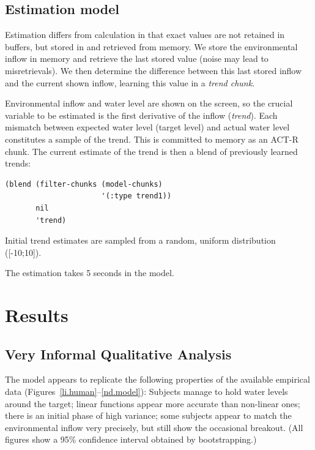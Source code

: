 \documentclass[twocolumn]{article}
\begin{document}
\subsection{Estimation model}
\label{sec:estimation-model}

Estimation differs from calculation in that exact values are not retained in buffers, but stored in and retrieved from memory.  We store the environmental inflow in memory and retrieve the last stored value (noise may lead to misretrievals).  We then determine the difference between this last stored inflow and the current shown inflow, learning this value in a \emph{trend chunk}.

Environmental inflow and water level are shown on the screen, so the crucial variable to be estimated is the first derivative of the inflow (\emph{trend}).  Each mismatch between expected water level (target level) and actual water level constitutes a sample of the trend.  This is committed to memory as an ACT-R chunk.  The current estimate of the trend is then a blend of previously learned trends:

\begin{verbatim}
(blend (filter-chunks (model-chunks)
                      '(:type trend1)) 
       nil
       'trend)
\end{verbatim}


Initial trend estimates are sampled from a random, uniform distribution ([-10;10]).

The estimation takes 5 seconds in the model. 





\section{Results}

\subsection{Very Informal Qualitative Analysis}

The model appears to replicate the following properties of the available empirical data (Figures~\ref{li.human}--\ref{nd.model}): Subjects manage to hold water levels around the target; linear functions appear more accurate than non-linear ones; there is an initial phase of high variance; some subjects appear to match the environmental inflow very precisely, but still show the occasional breakout.  (All figures show a 95\% confidence interval obtained by bootstrapping.)
\end{document}
